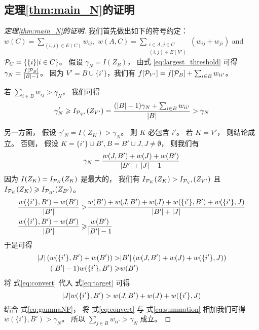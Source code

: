 \subsection{定理\ref{thm:main_N}的证明}
    \begin{proof}[定理\ref{thm:main_N}的证明]
      我们首先做出如下的符号约定：
      $w(C) = \displaystyle\sum_{(i,j) \in E(C)} w_{ij},$
      $w(A, C) = \displaystyle\sum_{\substack{i \in A, j \in C \\ (i,j) \in E(V')}} (w_{ij}+w_{ji})$ and
      $\P_C = \{\{i \}| i \in C \}$。
      假设 $\gamma_N = I(Z_B)$，
      由式 \eqref{eq:largest_threshold} 可得
      $\gamma_N =\frac{f[\P_B]} {\abs{B} -1}$。
      因为 $V' = B \cup \{i'\}$，我们有
      $f[\P_{V'}] = f[\P_B] + \sum_{i \in B}w_{ii'}$。
      
      若 $ \sum_{i \in B} w_{ij} > \gamma_N$， 我们可得
      $$
      \gamma'_N \geq I_{\P_{V'}}(Z_{V'}) = \frac{(\abs{B}-1)\gamma_N
      + \sum_{i \in B}w_{ii'}}{\abs{B}} > \gamma_N
      $$
      
      另一方面， 假设 
      $\gamma'_N = I(Z_K) > \gamma_N$。 则 $K$ 必包含 $i'$。
      若 $K=V'$， 则结论成立。
      否则， 假设 $K = \{i'\} \cup B', B=B'\cup J, J\neq \emptyset$，
      则我们有
      \begin{equation}\label{eq:gammaNF}
      \gamma_N = \frac{w(J,B') + w(J) + w(B')}{ \abs{B'} + \abs{J} - 1 }
      \end{equation}
      因为 $I(Z_K) = I_{\P_K}(Z_K)$ 是最大的，
      我们有 $I_{\P_K}(Z_K) > I_{\P_{V'}}(Z_{V'})$ 且
      $I_{\P_K}(Z_K) \geq I_{\P_{B'}}(Z_{B'})$。
      \begin{align*}
      \frac{w(\{i'\}, B') + w(B')}{\abs{B'}} >& \frac{w(B') + w(J, B') + w(J) + w(\{i'\}, B') + w(\{i'\}, J)}{\abs{B'} + \abs{J}}  \\
      \frac{w(\{i'\}, B') + w(B')}{\abs{B'}} \geq & \frac{w(B')}{\abs{B'} - 1}
      \end{align*}
      于是可得
      \begin{align}
      \abs{J} \left(w(\{i'\}, B') + w(B') \right) > &
      \abs{B'} \left(w(J, B') + w(J) + w(\{i'\}, J) \right)
      \label{eq:target}
      \\
      (\abs{B'} - 1)  w(\{i'\}, B') \geq & w(B') \label{eq:convert}
      \end{align}
      将 式\eqref{eq:convert} 代入 式\eqref{eq:target} 可得
      \begin{equation}\label{eq:summation}
      \abs{J} w(\{i'\}, B') > w(J, B') + w(J) + w(\{i'\}, J)
      \end{equation}
      结合 式\eqref{eq:gammaNF}，
      将 式\eqref{eq:convert} 与 式\eqref{eq:summation} 相加我们可得
      $w(\{i'\}, B') > \gamma_N$。
      所以 $\sum_{j \in B}w_{ii'} > \gamma_N $ 成立。
    \end{proof}
  
